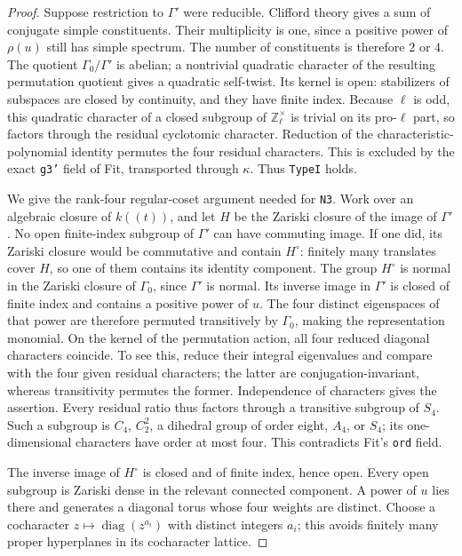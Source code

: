 \begin{proof}
Suppose restriction to $\Gamma'$ were reducible.
Clifford theory gives a sum of conjugate simple
constituents.  Their multiplicity is one, since a
positive power of $\rho(u)$ still has simple spectrum.
The number of constituents is therefore $2$ or $4$.
The quotient $\Gamma_0/\Gamma'$ is abelian; a
nontrivial quadratic character of the resulting
permutation quotient gives a quadratic self-twist.
Its kernel is open: stabilizers of subspaces are
closed by continuity, and they have finite index.
Because $\ell$ is odd, this quadratic character
of a closed subgroup of $\mathbb Z_\ell^\times$
is trivial on its pro-$\ell$ part, so factors through
the residual cyclotomic character.  Reduction of
the characteristic-polynomial identity permutes
the four residual characters.  This is excluded
by the exact \texttt{g3'} field of Fit, transported
through $\kappa$.  Thus \texttt{TypeI} holds.

We give the rank-four regular-coset argument needed
for \texttt{N3}.  Work over an algebraic closure of
$k((t))$, and let $H$ be the Zariski closure of
the image of $\Gamma'$.  No open finite-index
subgroup of $\Gamma'$ can have commuting image.
If one did, its Zariski closure would be
commutative and contain $H^\circ$: finitely
many translates cover $H$, so one of them
contains its identity component.  The group
$H^\circ$ is normal in the Zariski closure of
$\Gamma_0$, since $\Gamma'$ is normal.
Its inverse image in $\Gamma'$ is closed
of finite index and contains a positive power
of $u$.  The four distinct eigenspaces of
that power are therefore permuted transitively
by $\Gamma_0$, making the representation
monomial.  On the kernel of the
permutation action, all four reduced diagonal
characters coincide.  To see this, reduce their
integral eigenvalues and compare with the four
given residual characters; the latter are
conjugation-invariant, whereas transitivity
permutes the former.  Independence of characters
gives the assertion.  Every residual ratio thus
factors through a transitive subgroup of $S_4$.
Such a subgroup is $C_4$, $C_2^2$, a dihedral
group of order eight, $A_4$, or $S_4$; its
one-dimensional characters have order at most
four.  This contradicts Fit's \texttt{ord} field.

The inverse image of $H^\circ$ is closed and of finite index,
hence open.  Every open subgroup is Zariski dense
in the relevant connected component.  A power
of $u$ lies there and generates a diagonal torus
whose four weights are distinct.  Choose a
cocharacter $z\mapsto\operatorname{diag}(z^{a_i})$
with distinct integers $a_i$; this avoids finitely
many proper hyperplanes in its cocharacter lattice.


\end{proof}
